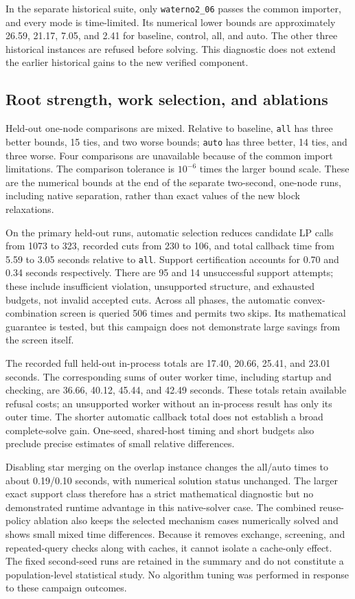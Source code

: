 In the separate historical suite, only \texttt{waterno2\_06}
passes the common importer, and every mode is time-limited. Its
numerical lower bounds are approximately 26.59, 21.17, 7.05, and
2.41 for baseline, control, all, and auto. The other three historical
instances are refused before solving. This diagnostic does not extend
the earlier historical gains to the new verified component.

\subsection{Root strength, work selection, and ablations}

Held-out one-node comparisons are mixed. Relative to baseline,
\texttt{all} has three better bounds, 15 ties, and two worse bounds;
\texttt{auto} has three better, 14 ties, and three worse. Four
comparisons are unavailable because of the common import limitations.
The comparison tolerance is $10^{-6}$ times the larger bound scale.
These are the numerical bounds at the end of the separate two-second,
one-node runs, including native separation, rather than exact values
of the new block relaxations.

On the primary held-out runs, automatic selection reduces candidate
LP calls from 1073 to 323, recorded cuts from 230 to 106, and total
callback time from 5.59 to 3.05 seconds relative to \texttt{all}.
Support certification accounts for 0.70 and 0.34 seconds respectively.
There are 95 and 14 unsuccessful support attempts; these include
insufficient violation, unsupported structure, and exhausted budgets,
not invalid accepted cuts. Across all phases, the automatic
convex-combination screen is queried 506 times and permits two
skips. Its mathematical guarantee is tested, but this campaign does
not demonstrate large savings from the screen itself.

The recorded full held-out in-process totals are 17.40, 20.66, 25.41,
and 23.01 seconds. The corresponding sums of outer worker time,
including startup and checking, are 36.66, 40.12, 45.44, and 42.49
seconds. These totals retain available refusal costs; an unsupported
worker without an in-process result has only its outer time.
The shorter automatic callback total does not establish a broad
complete-solve gain. One-seed, shared-host timing and short budgets
also preclude precise estimates of small relative differences.

Disabling star merging on the overlap instance changes the all/auto
times to about 0.19/0.10 seconds, with numerical solution status
unchanged. The larger exact support class therefore has a strict
mathematical diagnostic but no demonstrated runtime advantage in
this native-solver case. The combined reuse-policy ablation also
keeps the selected mechanism cases numerically solved and shows
small mixed time differences. Because it removes exchange,
screening, and repeated-query checks along with caches, it cannot
isolate a cache-only effect. The fixed second-seed runs are retained
in the summary and do not constitute a population-level statistical
study. No algorithm tuning was performed in response to these
campaign outcomes.

